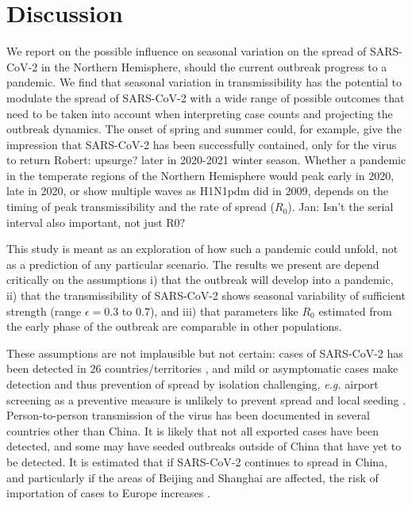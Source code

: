 \documentclass[rmp, reprint, superscriptaddress, floatfix,amsmath]{revtex4-1}
\newcommand{\Robert}[1]{{\color{celestialblue}Robert: #1}}
\newcommand{\Jan}[1]{{\color{deepsaffron}Jan: #1}}
\begin{document}
\section{Discussion}

We report on the possible influence on seasonal variation on the spread of SARS-CoV-2 in the Northern Hemisphere, should the current outbreak progress to a pandemic. We find that seasonal variation in transmissibility has the potential to modulate the spread of SARS-CoV-2 with a wide range of possible outcomes that need to be taken into account when interpreting case counts and projecting the outbreak dynamics. 
The onset of spring and summer could, for example, give the impression that SARS-CoV-2 has been successfully contained, %
only for the virus to return \Robert{upsurge?} later in 2020-2021 winter season. 
Whether a pandemic in the temperate regions of the Northern Hemisphere would peak early in 2020, late in 2020, or show multiple waves as H1N1pdm did in 2009, depends on the timing of peak transmissibility and the rate of spread ($R_0$). \Jan{Isn't the serial interval also important, not just R0?}

This study is meant as an exploration of how such a pandemic could unfold, not as a prediction of any particular scenario.
The results we present are depend critically on the assumptions
i) that the outbreak will develop into a pandemic,
ii) that the transmissibility of SARS-CoV-2 shows seasonal variability of sufficient strength (range $\epsilon=0.3$ to $0.7$), and  
iii) that parameters like $R_0$ estimated from the early phase of the outbreak are comparable in other populations. 

These assumptions are not implausible but not certain: cases of SARS-CoV-2 has been detected in 26 countries/territories \citep{ECDC_situation_update}, and mild or asymptomatic cases make detection and thus prevention of spread by isolation challenging, \textit{e.g.} airport screening as a preventive measure is unlikely to prevent spread and local seeding \citep{quilty2020effectiveness}. 
Person-to-person transmission of the virus has been documented in several countries other than China. 
It is likely that not all exported cases have been detected, and some may have seeded outbreaks outside of China that have yet to be detected. It is estimated that if SARS-CoV-2 continues to spread in China, and particularly if the areas of Beijing and Shanghai are affected, the risk of importation of cases to Europe increases \citep{pullano2020novel}.
\end{document}
